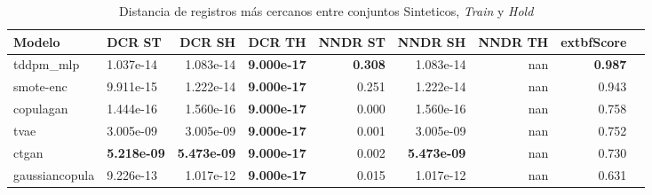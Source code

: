 \begin{table}[H]
\centering
\caption{Distancia de registros más cercanos entre conjuntos Sinteticos, \emph{Train} y \emph{Hold}}
\label{table-dcr-economicos-b-3}
\begin{tabular}{|l|l|r|r|r|r|r|r|r|}
\hline
\rowcolor[gray]{0.8}
Modelo & DCR ST & DCR SH & DCR TH & NNDR ST & NNDR SH & NNDR TH & 	extbf{Score} \\
\hline tddpm\_mlp & 1.037e-14 & 1.083e-14 & \cellcolor[rgb]{0.9, 0.54, 0.52} \bfseries 9.000e-17 & \bfseries 0.308 & 1.083e-14 & nan & \bfseries 0.987 \\
\hline smote-enc & 9.911e-15 & 1.222e-14 & \cellcolor[rgb]{0.9, 0.54, 0.52} \bfseries 9.000e-17 & 0.251 & 1.222e-14 & nan & 0.943 \\
\hline copulagan & \cellcolor[rgb]{0.9, 0.54, 0.52} 1.444e-16 & \cellcolor[rgb]{0.9, 0.54, 0.52} 1.560e-16 & \cellcolor[rgb]{0.9, 0.54, 0.52} \bfseries 9.000e-17 & \cellcolor[rgb]{0.9, 0.54, 0.52} 0.000 & \cellcolor[rgb]{0.9, 0.54, 0.52} 1.560e-16 & nan & 0.758 \\
\hline tvae & 3.005e-09 & 3.005e-09 & \cellcolor[rgb]{0.9, 0.54, 0.52} \bfseries 9.000e-17 & 0.001 & 3.005e-09 & nan & 0.752 \\
\hline ctgan & \bfseries 5.218e-09 & \bfseries 5.473e-09 & \cellcolor[rgb]{0.9, 0.54, 0.52} \bfseries 9.000e-17 & 0.002 & \bfseries 5.473e-09 & nan & 0.730 \\
\hline gaussiancopula & 9.226e-13 & 1.017e-12 & \cellcolor[rgb]{0.9, 0.54, 0.52} \bfseries 9.000e-17 & 0.015 & 1.017e-12 & nan & 0.631 \\
\hline
\end{tabular}
\end{table}
